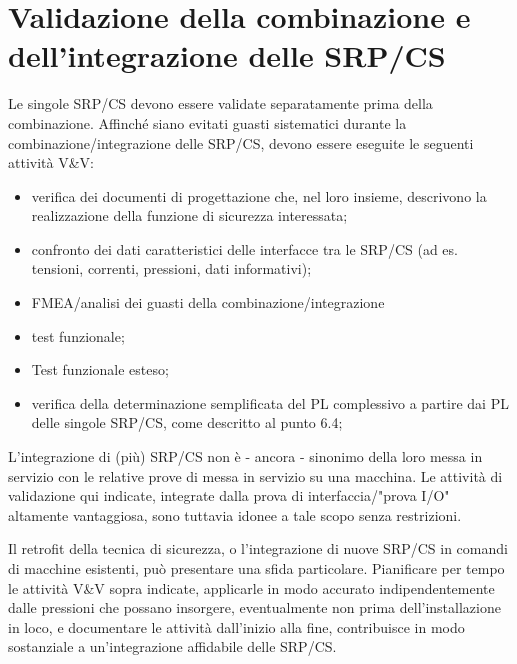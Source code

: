 \section{Validazione della combinazione e dell'integrazione delle SRP/CS}
\label{sec:07-6}
Le singole SRP/CS devono essere validate separatamente prima della combinazione. Affinché siano evitati guasti sistematici durante la combinazione/integrazione delle SRP/CS, devono essere eseguite le seguenti attività V\&V:
\begin{itemize}
    \item verifica dei documenti di progettazione che, nel loro insieme, descrivono la realizzazione della funzione di sicurezza interessata;
    \item confronto dei dati caratteristici delle interfacce tra le SRP/CS (ad es. tensioni, correnti, pressioni, dati informativi);
    \item FMEA/analisi dei guasti della combinazione/integrazione
    \item test funzionale;
    \item Test funzionale esteso;
    \item verifica della determinazione semplificata del PL complessivo a partire dai PL delle singole SRP/CS, come descritto al punto 6.4;
\end{itemize}

L'integrazione di (più) SRP/CS non è - ancora - sinonimo della loro messa in servizio con le relative prove di messa in servizio su una macchina. Le attività di validazione qui indicate, integrate dalla prova di interfaccia/"prova I/O" altamente vantaggiosa, sono tuttavia idonee a tale scopo senza restrizioni.

Il retrofit della tecnica di sicurezza, o l'integrazione di nuove SRP/CS in comandi di macchine esistenti, può presentare una sfida particolare. Pianificare per tempo le attività V\&V sopra indicate, applicarle in modo accurato indipendentemente dalle pressioni che possano insorgere, eventualmente non prima dell'installazione in loco, e documentare le attività dall'inizio alla fine, contribuisce in modo sostanziale a un'integrazione affidabile delle SRP/CS.

